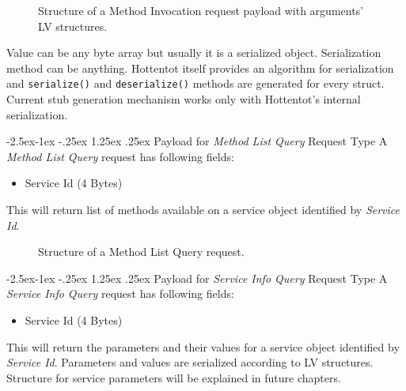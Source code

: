 \documentclass[10pt,a4paper]{article}
\makeatletter
\renewcommand\paragraph{\@startsection{paragraph}{4}{\z@}%
            {-2.5ex\@plus -1ex \@minus -.25ex}%
            {1.25ex \@plus .25ex}%
            {\normalfont\normalsize\bfseries}}
\makeatother
\begin{document}
\begin{figure}[!ht]
  \caption{Structure of a Method Invocation request payload with arguments' LV structures.}
  \centering
\end{figure}

Value can be any byte array but usually it is a serialized object. Serialization method can be anything. Hottentot itself provides an algorithm for serialization and \texttt {serialize()} and \texttt {deserialize()} methods are generated for every struct. Current stub generation mechanism works only with Hottentot's internal serialization.

\paragraph{Payload for \textit{Method List Query} Request Type} 
A \textit{Method List Query} request has following fields:
\begin{itemize}
  \item Service Id (4 Bytes)
\end{itemize}
This will return list of methods available on a service object identified by \textit{Service Id}.

\begin{figure}[!ht]
  \caption{Structure of a Method List Query request.}
  \centering
\end{figure}

\paragraph{Payload for \textit{Service Info Query} Request Type} 
A \textit{Service Info Query} request has following fields:
\begin{itemize}
  \item Service Id (4 Bytes)
\end{itemize}
This will return the parameters and their values for a service object identified by \textit{Service Id}. Parameters and values are serialized according to LV structures. Structure for service parameters will be explained in future chapters.
\end{document}
